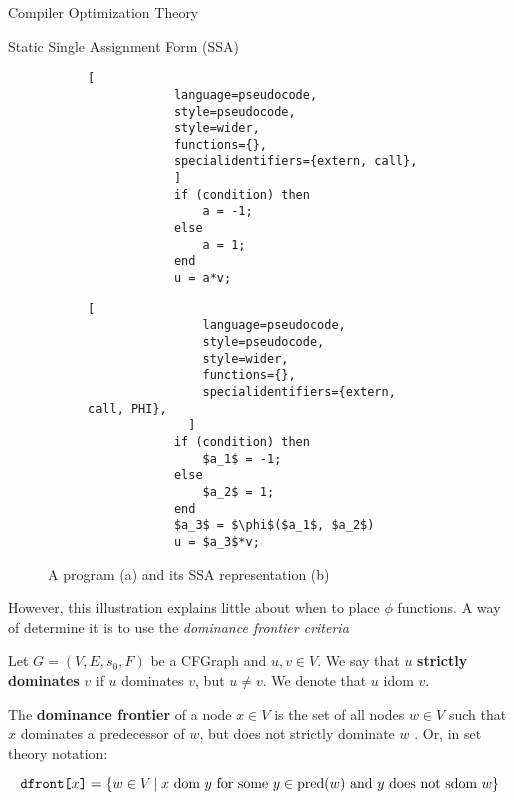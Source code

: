 \begin{section}{Compiler Optimization Theory}
\begin{subsection}{Static Single Assignment Form (SSA)}
\begin{figure}[ht]
    \centering
    \begin{subfigure}[b]{0.40\textwidth}

        \begin{lstlisting}[
            language=pseudocode,
            style=pseudocode,
            style=wider,
            functions={},
            specialidentifiers={extern, call},
            ]
            if (condition) then
                a = -1;
            else
                a = 1;
            end
            u = a*v;
        \end{lstlisting}
        \caption{\label{fig:code_normal}}
    \end{subfigure}
    \begin{subfigure}[b]{0.40\textwidth}
        \begin{lstlisting}[
                language=pseudocode,
                style=pseudocode,
                style=wider,
                functions={},
                specialidentifiers={extern, call, PHI},
              ]
            if (condition) then
                $a_1$ = -1;
            else
                $a_2$ = 1;
            end
            $a_3$ = $\phi$($a_1$, $a_2$)
            u = $a_3$*v;
        \end{lstlisting}
        \caption{\label{fig:code_ssa_form}}
\end{subfigure}
\caption{A program (a) and its SSA representation (b)}
\end{figure}

However, this illustration explains little about when to
place $\phi$ functions. A way of determine it is to use
the \textit{dominance frontier criteria}

\begin{definition}
	Let $G = (V, E, s_0, F)$ be a CFGraph and $u, v \in V$. We say that
	$u$ \textbf{strictly dominates} $v$ if $u$ dominates $v$, but
	$u \neq v$. We denote that $u$ idom $v$.
\end{definition}

\begin{definition}
	The \textbf{dominance frontier} of a node $x \in V$ is the set of all nodes $w \in V$
	such that $x$ dominates a predecessor of $w$, but does not strictly dominate $w$ \citep{appel2004modern}.
	Or, in set theory notation:
\end{definition}
\vspace*{-1cm}
	$$\texttt{dfront[}x\texttt{]} = \{w \in V\,|\;x \text{ dom } y \text{ for some } y \in \text{pred}(w) \text{ and } y \text{ does not sdom } w\}$$


\end{subsection}
\end{section}
